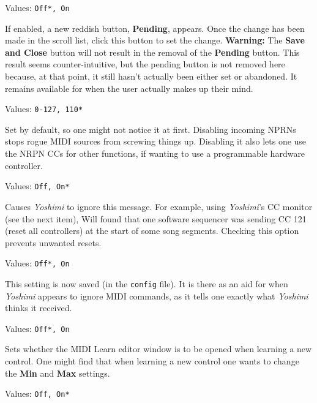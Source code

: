 
   Values: \texttt{Off*, On}

   If enabled, a new reddish button, \textbf{Pending}, appears.
   Once the change has been made in the scroll list, click this button
   to set the change.
   \textbf{Warning:}
   The \textbf{Save and Close} button will not result in the removal of the
   \textbf{Pending} button.
   This result seems counter-intuitive, but the pending button is not removed
   here because, at that point, it still hasn't actually been either set or
   abandoned. It remains available for when the user actually makes up their
   mind.

   Values: \texttt{0-127, 110*}

   Set by default, so one might not notice it at first.
   Disabling incoming NPRNs stops rogue MIDI sources from screwing things up.
   Disabling it also lets one use the NRPN CCs for other functions,
   if wanting to use a programmable hardware controller.

   Values: \texttt{Off, On*}

   Causes \textsl{Yoshimi} to ignore this message.
   For example, using \textsl{Yoshimi}'s CC monitor (see the next
   item), Will found that one software sequencer was sending CC 121 (reset all
   controllers) at the start of some song segments.  Checking this option
   prevents unwanted resets.

   Values: \texttt{Off*, On}

   This setting is now saved (in the \texttt{config} file). It is there
   as an aid for when \textsl{Yoshimi} appears to ignore MIDI commands,
   as it tells one exactly what \textsl{Yoshimi} thinks it received.

   Values: \texttt{Off*, On}

   Sets whether the MIDI Learn editor window is to be opened when learning a
   new control. One might find that when learning a new control one
   wants to change the \textbf{Min} and \textbf{Max} settings.

   Values: \texttt{Off, On*}

